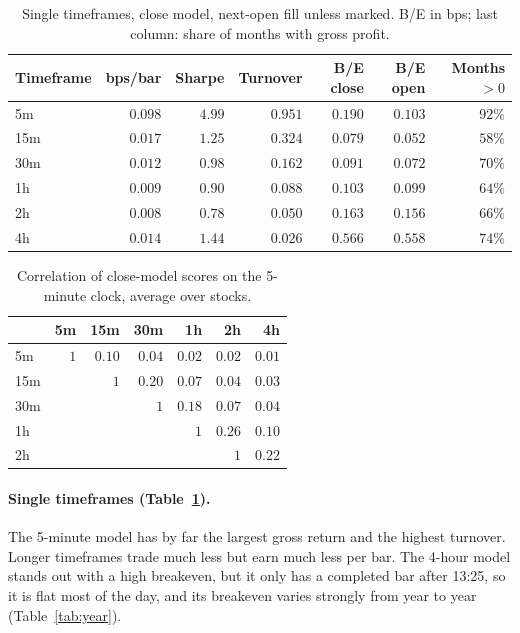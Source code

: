 \documentclass[11pt,a4paper]{article}
\begin{document}
\begin{table}[htbp]
\centering
\caption{Single timeframes, close model, next-open fill unless marked. B/E in bps; last column: share of
months with gross profit.}
\label{tab:single}
\small
\begin{tabular}{@{}lrrrrrr@{}}
\toprule
Timeframe & bps/bar & Sharpe & Turnover & B/E close & B/E open & Months $>0$ \\
\midrule
5m & $0.098$ & $4.99$ & $0.951$ & $0.190$ & $0.103$ & $92\%$ \\
15m & $0.017$ & $1.25$ & $0.324$ & $0.079$ & $0.052$ & $58\%$ \\
30m & $0.012$ & $0.98$ & $0.162$ & $0.091$ & $0.072$ & $70\%$ \\
1h & $0.009$ & $0.90$ & $0.088$ & $0.103$ & $0.099$ & $64\%$ \\
2h & $0.008$ & $0.78$ & $0.050$ & $0.163$ & $0.156$ & $66\%$ \\
4h & $0.014$ & $1.44$ & $0.026$ & $0.566$ & $0.558$ & $74\%$ \\
\bottomrule
\end{tabular}
\end{table}

\begin{table}[htbp]
\centering
\caption{Correlation of close-model scores on the 5-minute clock, average over stocks.}
\label{tab:corr}
\small
\begin{tabular}{@{}lrrrrrr@{}}
\toprule
& 5m & 15m & 30m & 1h & 2h & 4h \\
\midrule
5m & $1$ & $0.10$ & $0.04$ & $0.02$ & $0.02$ & $0.01$ \\
15m &  & $1$ & $0.20$ & $0.07$ & $0.04$ & $0.03$ \\
30m &  &  & $1$ & $0.18$ & $0.07$ & $0.04$ \\
1h &  &  &  & $1$ & $0.26$ & $0.10$ \\
2h &  &  &  &  & $1$ & $0.22$ \\
\bottomrule
\end{tabular}
\end{table}

\paragraph{Single timeframes (Table~\ref{tab:single}).} The 5-minute model has by far the largest gross
return and the highest turnover. Longer timeframes trade much less but earn much less per bar. The 4-hour
model stands out with a high breakeven, but it only has a completed bar after 13:25, so it is flat most
of the day, and its breakeven varies strongly from year to year (Table~\ref{tab:year}).
\end{document}
